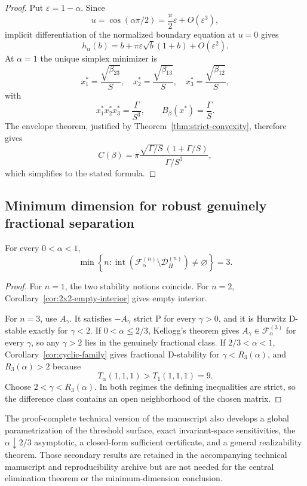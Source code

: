 \begin{proof}
Put \(\varepsilon=1-\alpha\). Since
\[
u=\cos(\alpha\pi/2)
=
\frac{\pi}{2}\varepsilon+O(\varepsilon^3),
\]
implicit differentiation of the normalized boundary equation at \(u=0\) gives
\[
h_\alpha(b)
=
b+\pi\varepsilon\sqrt b(1+b)+O(\varepsilon^2).
\]
At \(\alpha=1\) the unique simplex minimizer is
\[
x_1^*=\frac{\sqrt{\beta_{23}}}{S},
\quad
x_2^*=\frac{\sqrt{\beta_{13}}}{S},
\quad
x_3^*=\frac{\sqrt{\beta_{12}}}{S},
\]
with
\[
x_1^*x_2^*x_3^*=\frac{\Gamma}{S^3},
\qquad
B_\beta(x^*)=\frac{\Gamma}{S}.
\]
The envelope theorem, justified by Theorem~\ref{thm:strict-convexity}, therefore gives
\[
C(\beta)
=
\pi
\frac{\sqrt{\Gamma/S}\,(1+\Gamma/S)}
{\Gamma/S^3},
\]
which simplifies to the stated formula.
\end{proof}

\subsection{Minimum dimension for robust genuinely fractional separation}

\begin{theorem}
\label{thm:C09}
For every \(0<\alpha<1\),
\[
\min\left\{
n:
\operatorname{int}
\left(
\mathcal F_\alpha^{(n)}
\setminus
\mathcal D_H^{(n)}
\right)
\neq\varnothing
\right\}
=
3.
\]
\end{theorem}

\begin{proof}
For \(n=1\), the two stability notions coincide. For \(n=2\), Corollary~\ref{cor:2x2-empty-interior} gives empty interior.

For \(n=3\), use \(A_\gamma\). It satisfies \(-A_\gamma\) strict P for every \(\gamma>0\), and it is Hurwitz D-stable exactly for \(\gamma<2\). If \(0<\alpha\le2/3\), Kellogg's theorem gives \(A_\gamma\in\mathcal F_\alpha^{(3)}\) for every \(\gamma\), so any \(\gamma>2\) lies in the genuinely fractional class. If \(2/3<\alpha<1\), Corollary~\ref{cor:cyclic-family} gives fractional D-stability for \(\gamma<R_3(\alpha)\), and \(R_3(\alpha)>2\) because
\[
T_\alpha(1,1,1)>T_1(1,1,1)=9.
\]
Choose \(2<\gamma<R_3(\alpha)\). In both regimes the defining inequalities are strict, so the difference class contains an open neighborhood of the chosen matrix.
\end{proof}

The proof-complete technical version of the manuscript also develops a global parametrization of the threshold surface, exact invariant-space sensitivities, the \(\alpha\downarrow2/3\) asymptotic, a closed-form sufficient certificate, and a general realizability theorem. Those secondary results are retained in the accompanying technical manuscript and reproducibility archive but are not needed for the central elimination theorem or the minimum-dimension conclusion.
